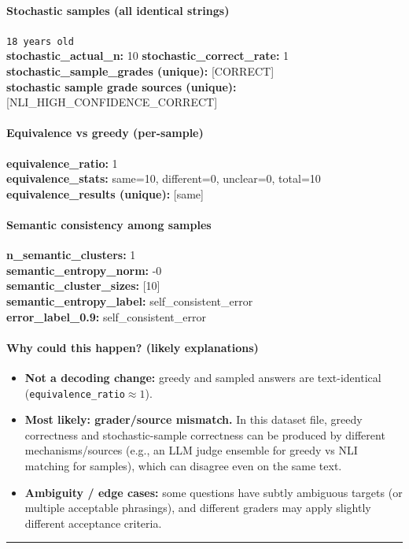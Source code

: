 \documentclass[11pt]{article}
\newcommand{\mono}[1]{\texttt{#1}}
\begin{document}
\paragraph{Stochastic samples (all identical strings)}
\mono{18 years old}\\
\textbf{stochastic\_actual\_n:} 10 \quad \textbf{stochastic\_correct\_rate:} 1\\
\textbf{stochastic\_sample\_grades (unique):} [CORRECT]\\
\textbf{stochastic sample grade sources (unique):} [NLI\_HIGH\_CONFIDENCE\_CORRECT]\\
\paragraph{Equivalence vs greedy (per-sample)}
\textbf{equivalence\_ratio:} 1\\
\textbf{equivalence\_stats:} same=10, different=0, unclear=0, total=10\\
\textbf{equivalence\_results (unique):} [same]\\
\paragraph{Semantic consistency among samples}
\textbf{n\_semantic\_clusters:} 1\\
\textbf{semantic\_entropy\_norm:} -0\\
\textbf{semantic\_cluster\_sizes:} [10]\\
\textbf{semantic\_entropy\_label:} self\_consistent\_error\\
\textbf{error\_label\_0.9:} self\_consistent\_error\\
\paragraph{Why could this happen? (likely explanations)}
\begin{itemize}\item \textbf{Not a decoding change:} greedy and sampled answers are text-identical (\mono{equivalence\_ratio}$\approx 1$).\item \textbf{Most likely: grader/source mismatch.} In this dataset file, greedy correctness and stochastic-sample correctness can be produced by different mechanisms/sources (e.g., an LLM judge ensemble for greedy vs NLI matching for samples), which can disagree even on the same text.\item \textbf{Ambiguity / edge cases:} some questions have subtly ambiguous targets (or multiple acceptable phrasings), and different graders may apply slightly different acceptance criteria.\end{itemize}
\vspace{10pt}
\hrule
\vspace{10pt}
\end{document}
